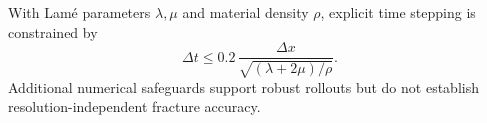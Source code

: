 With Lam\'e parameters $\lambda,\mu$ and material density $\rho$, explicit time stepping is constrained by
\begin{equation}\label{eq:cut_cfl}
  \Delta t\le 0.2\,\frac{\Delta x}{\sqrt{(\lambda+2\mu)/\rho}}.
\end{equation}
Additional numerical safeguards support robust rollouts but do not establish resolution-independent fracture accuracy.
